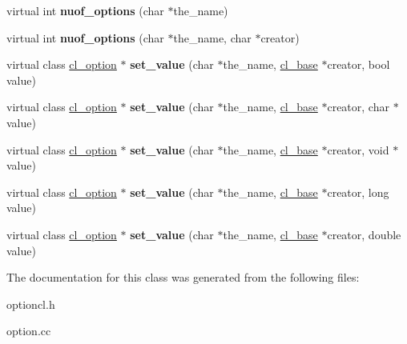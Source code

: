 \begin{DoxyCompactItemize}
\item 
\hypertarget{classcl__options_a0a495dafa4dae61dbcd14335d1b510b9}{
virtual int {\bfseries nuof\_\-options} (char $\ast$the\_\-name)}
\label{classcl__options_a0a495dafa4dae61dbcd14335d1b510b9}

\item 
\hypertarget{classcl__options_a2549d33961d9fbc55a3dcd87c4b51bf6}{
virtual int {\bfseries nuof\_\-options} (char $\ast$the\_\-name, char $\ast$creator)}
\label{classcl__options_a2549d33961d9fbc55a3dcd87c4b51bf6}

\item 
\hypertarget{classcl__options_a8f1b5df5a74df3a2f5486ba2a674da81}{
virtual class \hyperlink{classcl__option}{cl\_\-option} $\ast$ {\bfseries set\_\-value} (char $\ast$the\_\-name, \hyperlink{classcl__base}{cl\_\-base} $\ast$creator, bool value)}
\label{classcl__options_a8f1b5df5a74df3a2f5486ba2a674da81}

\item 
\hypertarget{classcl__options_a97789e2ce959ab98414627429452f899}{
virtual class \hyperlink{classcl__option}{cl\_\-option} $\ast$ {\bfseries set\_\-value} (char $\ast$the\_\-name, \hyperlink{classcl__base}{cl\_\-base} $\ast$creator, char $\ast$value)}
\label{classcl__options_a97789e2ce959ab98414627429452f899}

\item 
\hypertarget{classcl__options_a2d6a1f000cbe666ffb36e57e0795b743}{
virtual class \hyperlink{classcl__option}{cl\_\-option} $\ast$ {\bfseries set\_\-value} (char $\ast$the\_\-name, \hyperlink{classcl__base}{cl\_\-base} $\ast$creator, void $\ast$value)}
\label{classcl__options_a2d6a1f000cbe666ffb36e57e0795b743}

\item 
\hypertarget{classcl__options_ad8f398ba46e39ef8995642b0d2da4ab9}{
virtual class \hyperlink{classcl__option}{cl\_\-option} $\ast$ {\bfseries set\_\-value} (char $\ast$the\_\-name, \hyperlink{classcl__base}{cl\_\-base} $\ast$creator, long value)}
\label{classcl__options_ad8f398ba46e39ef8995642b0d2da4ab9}

\item 
\hypertarget{classcl__options_a5df4aef619ea72a8acc63aff30353776}{
virtual class \hyperlink{classcl__option}{cl\_\-option} $\ast$ {\bfseries set\_\-value} (char $\ast$the\_\-name, \hyperlink{classcl__base}{cl\_\-base} $\ast$creator, double value)}
\label{classcl__options_a5df4aef619ea72a8acc63aff30353776}

\end{DoxyCompactItemize}


The documentation for this class was generated from the following files:\begin{DoxyCompactItemize}
\item 
optioncl.h\item 
option.cc\end{DoxyCompactItemize}
